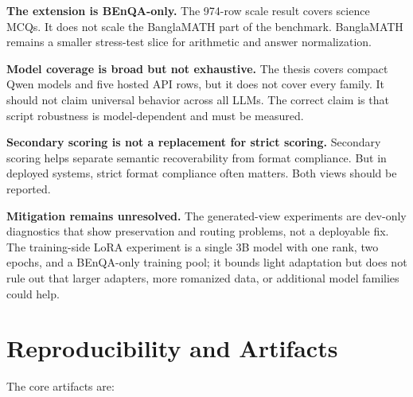 \textbf{The extension is BEnQA-only.} The 974-row scale result covers science MCQs. It does not scale the BanglaMATH part of the benchmark. BanglaMATH remains a smaller stress-test slice for arithmetic and answer normalization.

\textbf{Model coverage is broad but not exhaustive.} The thesis covers compact Qwen models and five hosted API rows, but it does not cover every family. It should not claim universal behavior across all LLMs. The correct claim is that script robustness is model-dependent and must be measured.

\textbf{Secondary scoring is not a replacement for strict scoring.} Secondary scoring helps separate semantic recoverability from format compliance. But in deployed systems, strict format compliance often matters. Both views should be reported.

\textbf{Mitigation remains unresolved.} The generated-view experiments are dev-only diagnostics that show preservation and routing problems, not a deployable fix. The training-side LoRA experiment is a single 3B model with one rank, two epochs, and a BEnQA-only training pool; it bounds light adaptation but does not rule out that larger adapters, more romanized data, or additional model families could help.

\section{Reproducibility and Artifacts}

The core artifacts are:

